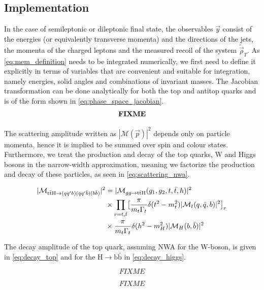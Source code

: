 \subsection{Implementation}
\label{sec:mem_implementation}
In the case of semileptonic or dileptonic \ttH final state, the observables $\vec{y}$ consist of the energies (or equivalently transverse momenta) and the directions of the jets, the momenta of the charged leptons and the measured recoil of the system $\tilde{\vec{\rho}}_T$. As \cref{eq:mem_definition} needs to be integrated numerically, we first need to define it explicitly in terms of variables that are convenient and suitable for integration, namely energies, solid angles and combinations of invariant masses. The Jacobian transformation can be done analytically for both the top and antitop quarks and is of the form shown in \cref{eq:phase_space_jacobian}.
\fix
\begin{align}
\label{eq:phase_space_jacobian}
~\textbf{FIXME}~
\end{align}

The scattering amplitude written as $|\mathcal{M}(\vec{p})|^2$ depends only on particle momenta, hence it is implied to be summed over spin and colour states. Furthermore, we treat the production and decay of the top quarks, W and Higgs bosons in the narrow-width approximation\cite{Berdine2007}, meaning we factorize the production and decay of these particles, as seen in \cref{eq:scattering_nwa}.

\begin{align}
\label{eq:scattering_nwa}
|\mathcal{M}_{\mathrm{t} \bar{\mathrm{t}} \mathrm{H} \rightarrow (qq'b) (qq'\bar{b}) (b\bar{b})}|^2 &= |\mathcal{M}_{gg \rightarrow \mathrm{t} \bar{\mathrm{t}} \mathrm{H}}(g_1, g_2, t, \bar{t}, h)|^2 \\
&\times \prod_{r = t,\bar{t}} \bigl[ \frac{\pi}{m_t \Gamma_t} \delta(t^2 - m_t^2) |\mathcal{M}_t(q,\bar{q},b)|^2 \bigr]_r \\
&\times \frac{\pi}{m_t \Gamma_t} \delta(h^2 - m_H^2) |\mathcal{M}_H(b,\bar{b})|^2
\end{align}

The decay amplitude of the top quark, assuming NWA for the W-boson, is given in \cref{eq:decay_top} and for the $\mathrm{H} \rightarrow \mathrm{b}\bar{\mathrm{b}}$ in \cref{eq:decay_higgs}.

\begin{equation}
\label{eq:decay_top}
FIXME
\end{equation}

\begin{equation}
\label{eq:decay_higgs}
FIXME
\end{equation}

